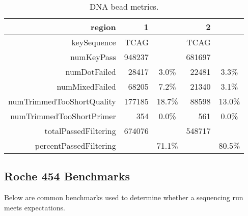 \documentclass[11pt]{article}
\begin{document}
\begin{table}[ht]
\begin{center}
\begin{tabular}{rrc|rc}
  \hline
region & 1	 & & 2 & \\
  \hline
keySequence & TCAG & & TCAG & \\
numKeyPass & 948237 & & 681697& \\
numDotFailed & 28417 & 3.0\% & 22481 & 3.3\%\\
numMixedFailed & 68205 & 7.2\% & 21340 & 3.1\%  \\
numTrimmedTooShortQuality & 177185 & 18.7\% & 88598 & 13.0\% \\
numTrimmedTooShortPrimer & 354 & 0.0\% & 561 &   0.0\% \\
totalPassedFiltering & 674076 & & 548717 & \\
percentPassedFiltering && 71.1\% && 80.5\%\\
   \hline
\end{tabular}
\caption{DNA bead metrics. }
\label{table3}
\end{center}
\end{table}


\subsection{Roche 454 Benchmarks}

Below are common benchmarks used to determine whether a sequencing run meets expectations.
\end{document}
